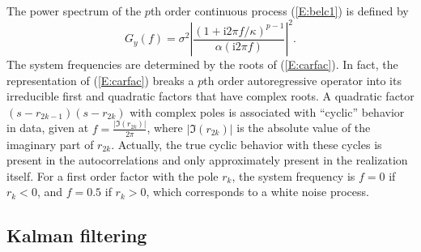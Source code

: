 The power spectrum of the $p$th order continuous process (\ref{E:belc1}) is defined by
\begin{equation}\label{E:carspe}
G_y(f)=\sigma^2\left|\frac{(1+\mbox{i}2\pi f/\kappa)^{p-1}}{\alpha(\mbox{i}2\pi f)}\right|^2.
\end{equation}
The system frequencies are determined by the roots of (\ref{E:carfac}). In fact, the representation of (\ref{E:carfac}) breaks a $p$th order autoregressive operator into its irreducible first and quadratic factors that have complex roots. A quadratic factor $(s-r_{2k-1})(s-r_{2k})$ with complex poles is associated with ``cyclic'' behavior in data, given at $f=\frac{|\Im(r_{2k})|}{2\pi}$, where $|\Im(r_{2k})|$ is the absolute value of the imaginary part of $r_{2k}$. Actually, the true cyclic behavior with these cycles is present in the autocorrelations and only approximately present in the realization itself. For a first order factor with the pole $r_k$, the system frequency is $f=0$ if $r_k<0$, and $f=0.5$ if $r_k>0$, which corresponds to a white noise process.


\subsection{Kalman filtering}\label{sub:modest}

